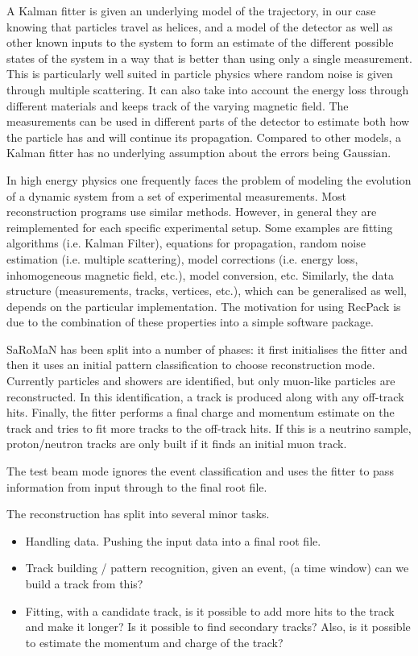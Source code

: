 A Kalman fitter is given an underlying model of the trajectory, in our case knowing that particles travel as helices, and a model of the detector as well as other known inputs to the system to form an estimate of the different possible states of the system in a way that is better than using only a single measurement. This is particularly well suited in particle physics where random noise is given through multiple scattering. It can also take into account the energy loss through different materials and keeps track of the varying magnetic field. The measurements can be used in different parts of the detector to estimate both how the particle has and will continue its propagation. Compared to other models, a Kalman fitter has no underlying assumption about the errors being Gaussian.

In high energy physics one frequently faces the problem of modeling the evolution of a dynamic system from a set of experimental measurements. Most reconstruction programs use similar methods. However, in general they are reimplemented for each specific experimental setup. Some examples are fitting algorithms (i.e. Kalman Filter), equations for propagation, random noise estimation (i.e. multiple scattering), model corrections (i.e. energy loss, inhomogeneous magnetic field, etc.), model conversion, etc. Similarly, the data structure (measurements, tracks, vertices, etc.), which can be generalised as well, depends on the particular implementation. The motivation for using RecPack is due to the combination of these properties into a simple software package.

SaRoMaN has been split into a number of phases: it first initialises the fitter and then it uses an initial pattern classification to choose reconstruction mode. Currently particles and showers are identified, but only muon-like particles are reconstructed. In this identification, a track is produced along with any off-track hits. Finally, the fitter performs a final charge and momentum estimate on the track and tries to fit more tracks to the off-track hits. If this is a neutrino sample, proton/neutron tracks are only built if it finds an initial muon track.

The test beam mode ignores the event classification and uses the fitter to pass information from input through to the final root file.

The reconstruction has split into several minor tasks.
\begin{itemize}
\item Handling data. Pushing the input data into a final root file.
\item Track building / pattern recognition, given an event, (a time window) can we build a track from this?
\item Fitting, with a candidate track, is it possible to add more hits to the track and make it longer? Is it possible to find secondary tracks? Also, is it possible to estimate the momentum and charge of the track?
\end{itemize}

